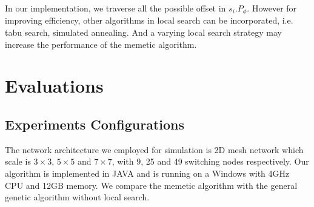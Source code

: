 \documentclass[journal]{IEEEtran}
\theoremstyle{remark}
\begin{document}
In our implementation,
 we traverse all the possible offset in $s_i.P_\phi$.
However for improving efficiency,
 other algorithms in local search can be incorporated,
  i.e. tabu search, simulated annealing.
And a varying local search strategy may increase the performance of the memetic algorithm.

\section{Evaluations \label{s:evalu}}

\subsection{Experiments Configurations}






The network architecture we employed for simulation is 2D mesh network which scale is $3\times 3$, $5\times 5$ and $7\times 7$,
 with 9, 25 and 49 switching nodes respectively.
Our algorithm is implemented in JAVA and is running on a Windows with 4GHz CPU and 12GB memory.
We compare the memetic algorithm with the general genetic algorithm without local search. 
\end{document}
